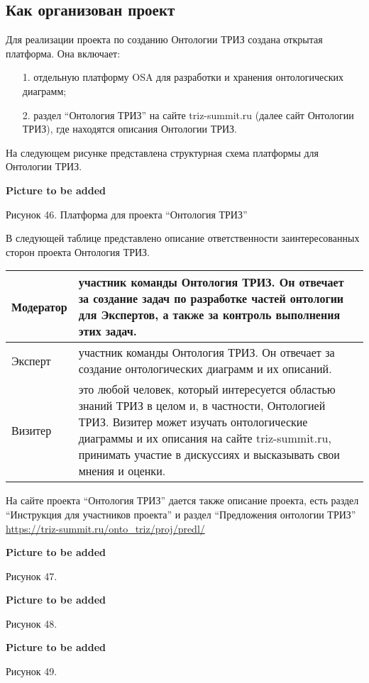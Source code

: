 \documentclass[11pt,a4paper]{article}
\newcommand{\addpicture}{\textbf{Picture to be added}\par}
\begin{document}
\subsection{Как организован проект}

Для реализации проекта по созданию Онтологии ТРИЗ создана открытая платформа.
Она включает:
\begin{itemize}
\item[1.] отдельную платформу OSA для разработки и хранения онтологических
  диаграмм;
\item[2.] раздел “Онтология ТРИЗ” на сайте triz-summit.ru (далее сайт
  Онтологии ТРИЗ), где находятся описания Онтологии ТРИЗ.
\end{itemize}
На следующем рисунке представлена структурная схема платформы для Онтологии
ТРИЗ.
\begin{center}
  \addpicture
  Рисунок 46. Платформа для проекта “Онтология ТРИЗ”
\end{center}
В следующей таблице представлено описание
ответственности заинтересованных сторон проекта Онтология ТРИЗ.
\begin{center}
  \begin{tabular}{|l|p{12cm}|}\hline
    Модератор & участник команды Онтология ТРИЗ. Он отвечает за создание задач
    по разработке частей онтологии для Экспертов, а также за контроль
    выполнения этих задач.\\\hline
    Эксперт & участник команды Онтология ТРИЗ. Он отвечает за создание
    онтологических диаграмм и их описаний.\\\hline
    Визитер & это любой человек, который интересуется областью знаний ТРИЗ в
    целом и, в частности, Онтологией ТРИЗ. Визитер может изучать
    онтологические диаграммы и их описания на сайте triz-summit.ru, принимать
    участие в дискуссиях и высказывать свои мнения и оценки. \\\hline
  \end{tabular}
\end{center}
На сайте проекта “Онтология ТРИЗ” дается также описание проекта, есть раздел
“Инструкция для участников проекта” и раздел “Предложения онтологии ТРИЗ”
\url{https://triz-summit.ru/onto_triz/proj/predl/}

\begin{center}
  \addpicture
  Рисунок 47.
\end{center}
\begin{center}
  \addpicture
  Рисунок 48.
\end{center}
\begin{center}
  \addpicture
  Рисунок 49.
\end{center}
\end{document}
